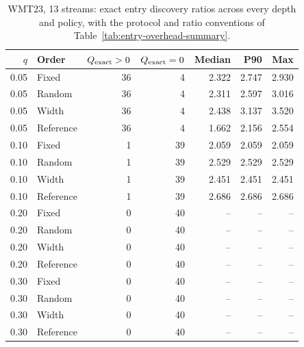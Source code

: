 \begin{table}[t]
\centering\small


\begin{tabular}{rlrrrrr}
\toprule
$q$ & Order & $Q_{\rm exact}>0$ & $Q_{\rm exact}=0$ & Median & P90 & Max \\
\midrule
0.05 & Fixed & 36 & 4 & 2.322 & 2.747 & 2.930 \\
0.05 & Random & 36 & 4 & 2.311 & 2.597 & 3.016 \\
0.05 & Width & 36 & 4 & 2.438 & 3.137 & 3.520 \\
0.05 & Reference & 36 & 4 & 1.662 & 2.156 & 2.554 \\
0.10 & Fixed & 1 & 39 & 2.059 & 2.059 & 2.059 \\
0.10 & Random & 1 & 39 & 2.529 & 2.529 & 2.529 \\
0.10 & Width & 1 & 39 & 2.451 & 2.451 & 2.451 \\
0.10 & Reference & 1 & 39 & 2.686 & 2.686 & 2.686 \\
0.20 & Fixed & 0 & 40 & -- & -- & -- \\
0.20 & Random & 0 & 40 & -- & -- & -- \\
0.20 & Width & 0 & 40 & -- & -- & -- \\
0.20 & Reference & 0 & 40 & -- & -- & -- \\
0.30 & Fixed & 0 & 40 & -- & -- & -- \\
0.30 & Random & 0 & 40 & -- & -- & -- \\
0.30 & Width & 0 & 40 & -- & -- & -- \\
0.30 & Reference & 0 & 40 & -- & -- & -- \\
\bottomrule
\end{tabular}
\caption{WMT23, 13 streams: exact entry discovery ratios across every depth and policy, with the protocol and ratio conventions of Table~\ref{tab:entry-overhead-summary}.}
\label{tab:entry-overhead-all-1}
\end{table}

